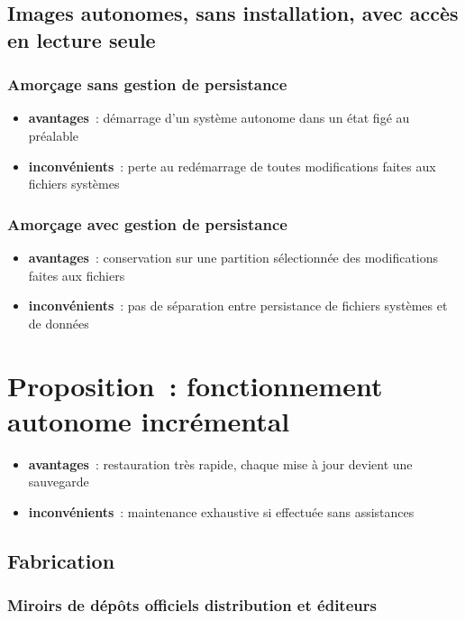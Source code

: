 \documentclass[10pt]{article}
\newenvironment{itmz}{\begin{itemize}
\setlength{\itemsep}{0em}
}{\end{itemize}}
\begin{document}
\subsection{Images autonomes, sans installation, avec accès en lecture seule}

\subsubsection{Amorçage sans gestion de persistance}

\begin{itmz}
\item{\textbf{avantages} : démarrage d’un système autonome dans un état figé au préalable}
\item{\textbf{inconvénients} : perte au redémarrage de toutes modifications faites aux fichiers systèmes}
\end{itmz}

\subsubsection{Amorçage avec gestion de persistance}

\begin{itmz}
\item{\textbf{avantages} : conservation sur une partition sélectionnée des modifications faites aux fichiers}
\item{\textbf{inconvénients} : pas de séparation entre persistance de fichiers systèmes et de données}
\end{itmz}

\section{Proposition : fonctionnement autonome incrémental}

\begin{itmz}
\item{\textbf{avantages} : restauration très rapide, chaque mise à jour devient une sauvegarde}
\item{\textbf{inconvénients} : maintenance exhaustive si effectuée sans assistances}
\end{itmz}

\subsection{Fabrication}

\subsubsection{Miroirs de dépôts officiels distribution et éditeurs}
\end{document}
